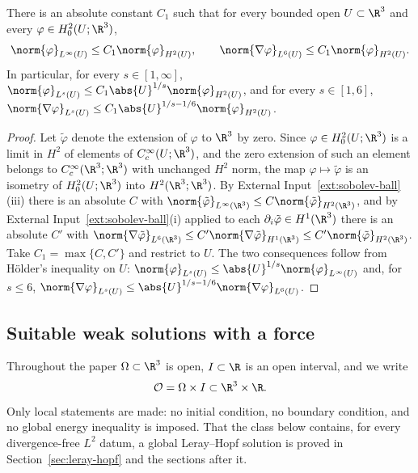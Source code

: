 \documentclass[11pt,reqno]{amsart}
\begin{document}
\begin{lemma}\label{lem:H2-embeddings}
There is an absolute constant $C_{1}$ such that for every bounded open
$U\subset\R^{3}$ and every $\varphi\in H^{2}_{0}(U;\R^{3})$,
\begin{equation}\label{eq:H2-emb}
  \norm{\varphi}_{L^{\infty}(U)}\le C_{1}\norm{\varphi}_{H^{2}(U)},
  \qquad
  \norm{\nabla\varphi}_{L^{6}(U)}\le C_{1}\norm{\varphi}_{H^{2}(U)} .
\end{equation}
In particular, for every $s\in[1,\infty]$,
$\norm{\varphi}_{L^{s}(U)}\le C_{1}\abs{U}^{1/s}\norm{\varphi}_{H^{2}(U)}$,
and for every $s\in[1,6]$,
$\norm{\nabla\varphi}_{L^{s}(U)}\le C_{1}\abs{U}^{1/s-1/6}\norm{\varphi}_{H^{2}(U)}$.
\end{lemma}

\begin{proof}
Let $\tilde\varphi$ denote the extension of $\varphi$ to $\R^{3}$ by zero. Since
$\varphi\in H^{2}_{0}(U;\R^{3})$ is a limit in $H^{2}$ of elements of
$C_{c}^{\infty}(U;\R^{3})$, and the zero extension of such an element belongs to
$C_{c}^{\infty}(\R^{3};\R^{3})$ with unchanged $H^{2}$ norm, the map
$\varphi\mapsto\tilde\varphi$ is an isometry of $H^{2}_{0}(U;\R^{3})$ into
$H^{2}(\R^{3};\R^{3})$. By External Input~\ref{ext:sobolev-ball}(iii) there is
an absolute $C$ with
$\norm{\tilde\varphi}_{L^{\infty}(\R^{3})}\le C\norm{\tilde\varphi}_{H^{2}(\R^{3})}$,
and by External Input~\ref{ext:sobolev-ball}(i) applied to each
$\partial_{i}\tilde\varphi\in H^{1}(\R^{3})$ there is an absolute $C'$ with
$\norm{\nabla\tilde\varphi}_{L^{6}(\R^{3})}\le C'\norm{\nabla\tilde\varphi}_{H^{1}(\R^{3})}
 \le C'\norm{\tilde\varphi}_{H^{2}(\R^{3})}$. Take $C_{1}=\max\{C,C'\}$ and
restrict to $U$. The two consequences follow from H\"older's inequality on $U$:
$\norm{\varphi}_{L^{s}(U)}\le\abs{U}^{1/s}\norm{\varphi}_{L^{\infty}(U)}$ and,
for $s\le6$,
$\norm{\nabla\varphi}_{L^{s}(U)}\le\abs{U}^{1/s-1/6}\norm{\nabla\varphi}_{L^{6}(U)}$.
\end{proof}

\subsection{Suitable weak solutions with a force}\label{ss:sws}

Throughout the paper $\Omega\subset\R^{3}$ is open, $I\subset\R$ is an open
interval, and we write
\[
  \mathcal{O}=\Omega\times I\subset\R^{3}\times\R .
\]
Only local statements are made: no initial condition, no boundary condition, and
no global energy inequality is imposed. That the class below contains, for
every divergence-free $L^2$ datum, a global Leray--Hopf solution is proved in
Section~\ref{sec:leray-hopf} and the sections after it.
\end{document}
